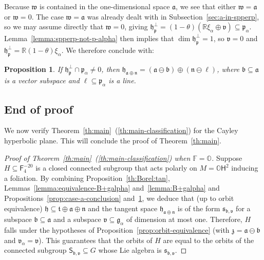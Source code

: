 \documentclass[12pt, a4paper]{amsart}
\newcommand{\g}{\mathfrak}
\newcommand{\s}{\mathsf}
\newcommand{\R}{\mathbb{R}}
\renewcommand{\O}{\mathbb{O}}
\newcommand{\F}{\mathbb{F}}
\newtheorem{proposition}[theorem]{Proposition}
\theoremstyle{definition}
\begin{document}
Because $\g{w}$ is contained in the one-dimensional space $\g{a}$, we see that either $\g{w}=\g{a}$ or $\g{w}=0$.
The case $\g{w}=\g{a}$ was already dealt with in Subsection~\ref{sec:a-in-spperp}, 
so we may assume directly that $\g{w}=0$, giving $\g{h}_{\g{p}}^\perp=(1-\theta)(\R \xi_\alpha \oplus \g{v})\subseteq \g{p}_\alpha$.
Lemma~\ref{lemma:spperp-not-p-alpha} then implies that 
$\dim \g{h}_{\g{p}}^\perp=1$, so $\g{v}=0$ and 
$\g{h}_{\g{p}}^\perp=\R (1-\theta)\xi_\alpha$.
We therefore conclude with:

\begin{proposition}\label{prop:case-palpha-conclusion}
If $\g{h}_{\g{p}}^\perp\cap \g{p}_\alpha \neq 0$, 
then $\g{h}_{\g{a}\oplus\g{n}}=(\g{a}\ominus \g{b})\oplus (\g{n}\ominus \ell)$, 
where $\g{b}\subseteq \g{a}$ is a vector subspace and $\ell\subseteq \g{p}_\alpha$ is a line.
\end{proposition}


\subsection{End of proof}\hfill

We now verify Theorem~\ref{th:main}~(\ref{th:main-classification}) for
the Cayley hyperbolic plane.
This will conclude the proof of Theorem~\ref{th:main}.

\begin{proof}[Proof of Theorem~\textup{\ref{th:main}~(\ref{th:main-classification})} when $\F=\O$]
Suppose $H\subseteq \s{F}_4^{-20}$ is a closed connected subgroup that acts polarly on
$M=\O\s{H}^2$ inducing a foliation.
By combining Proposition~\ref{th:Borel:tan}, Lemmas~\ref{lemma:equivalence-B+galpha} and~\ref{lemma:B+galpha} and Propositions~\ref{prop:case-a-conclusion} and~\ref{prop:case-palpha-conclusion}, we deduce that (up to orbit equivalence) $\g{h}\subseteq\g{t}\oplus\g{a}\oplus\g{n}$
and the tangent space 
$\g{h}_{\g{a}\oplus\g{n}}$ is of the form $\g{s}_{\g{b},\g{v}}$ for a subspace $\g{b}\subseteq \g{a}$ and a subspace $\g{v}\subseteq \g{g}_\alpha$ of dimension at most one.
Therefore, $H$ falls under the hypotheses of Proposition~\ref{prop:orbit-equivalence} (with $\g{z}=\g{a}\ominus\g{b}$ and $\g{v}_\alpha=\g{v}$).
This guarantees that the orbits of $H$ are equal to the orbits of the connected subgroup 
$\s{S}_{\g{b},\g{v}}\subseteq G$ whose Lie algebra is $\g{s}_{\g{b},\g{v}}$.
\end{proof}
\end{document}
